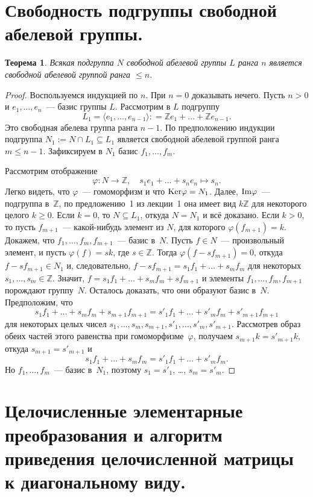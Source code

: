 \documentclass[a4paper, 12pt]{article}
\def\Ker{{\rm Ker}}%
\def\Im{{\rm Im}}%
\def\ZZ{{\mathbb Z}}%
\newtheorem{theorem}{Теорема}
\theoremstyle{definition}
\theoremstyle{remark}
\begin{document}
\section{Свободность подгруппы свободной абелевой группы.}

\begin{theorem}
Всякая подгруппа $N$ свободной абелевой группы $L$ ранга $n$
является свободной абелевой группой ранга $\leqslant n$.
\end{theorem}

\begin{proof}
Воспользуемся индукцией по $n$. При $n=0$ доказывать нечего. Пусть
$n>0$ и $e_1,\ldots,e_n$~--- базис группы $L$. Рассмотрим в $L$
подгруппу
$$
L_1 = \langle e_1,\ldots,e_{n-1}\rangle : = \ZZ e_1 + \ldots + \ZZ
e_{n-1}.
$$
Это свободная абелева группа ранга $n-1$. По предположению индукции
подгруппа $N_1:=N\cap L_1 \subseteq L_1$ является свободной абелевой
группой ранга $m \leqslant n-1$. Зафиксируем в $N_1$ базис $f_1,
\ldots, f_m$.

Рассмотрим отображение
$$
\varphi \colon N \to \ZZ, \quad s_1e_1 + \ldots + s_ne_n \mapsto
s_n.
$$
Легко видеть, что $\varphi$~--- гомоморфизм и что $\Ker \varphi =
N_1$. Далее, $\Im \varphi$~--- подгруппа в~$\ZZ$, по предложению~1
из лекции~1 она имеет вид $k \ZZ$ для некоторого целого $k \geqslant
0$. Если $k=0$, то $N \subseteq L_1$, откуда $N = N_1$ и всё
доказано. Если $k>0$, то пусть $f_{m+1}$~--- какой-нибудь элемент из
$N$, для которого $\varphi(f_{m+1}) = k$. Докажем, что $f_1, \ldots,
f_m, f_{m+1}$~--- базис в~$N$. Пусть $f \in N$~--- произвольный
элемент, и пусть $\varphi(f) = sk$, где $s \in \ZZ$. Тогда
$\varphi(f - sf_{m+1}) = 0$, откуда $f - sf_{m+1} \in N_1$ и,
следовательно, $f - sf_{m+1} = s_1 f_1 + \ldots + s_m f_m$ для
некоторых $s_1, \ldots, s_m \in \ZZ$. Значит, $f = s_1 f_1 + \ldots
+ s_m f_m + s f_{m+1}$ и элементы $f_1, \ldots, f_m, f_{m+1}$
порождают группу~$N$. Осталось доказать, что они образуют базис
в~$N$. Предположим, что
$$
s_1 f_1 + \ldots + s_m f_m + s_{m+1} f_{m+1} = s'_1 f_1 + \ldots +
s'_m f_m + s'_{m+1} f_{m+1}
$$
для некоторых целых чисел $s_1, \ldots, s_m, s_{m+1}, s'_1, \ldots,
s'_m, s'_{m+1}$. Рассмотрев образ обеих частей этого равенства при
гомоморфизме~$\varphi$, получаем $s_{m+1} k = s'_{m+1} k$, откуда
$s_{m+1} = s'_{m+1}$ и
$$
s_1 f_1 + \ldots + s_m f_m = s'_1 f_1 + \ldots + s'_m f_m.
$$
Но $f_1, \ldots, f_m$~--- базис в~$N_1$, поэтому $s_1 = s'_1$,
\ldots, $s_m = s'_m$.
\end{proof}


\section{Целочисленные элементарные преобразования и алгоритм приведения целочисленной матрицы к диагональному виду.}
\end{document}
